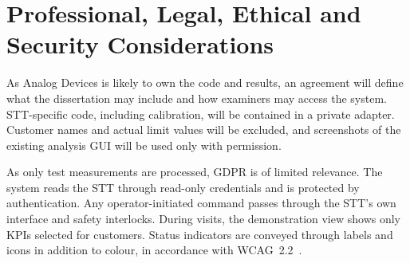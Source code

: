 \section{Professional, Legal, Ethical and Security Considerations}
\label{sec:professional}

As Analog Devices is likely to own the code and results, an agreement will define what the dissertation may include and how examiners may access the system.
STT-specific code, including calibration, will be contained in a private adapter.
Customer names and actual limit values will be excluded, and screenshots of the existing analysis GUI will be used only with permission.

As only test measurements are processed, GDPR is of limited relevance.
The system reads the STT through read-only credentials and is protected by authentication.
Any operator-initiated command passes through the STT's own interface and safety interlocks.
During visits, the demonstration view shows only KPIs selected for customers.
Status indicators are conveyed through labels and icons in addition to colour, in accordance with WCAG~2.2~\cite{w3c2023wcag}.
